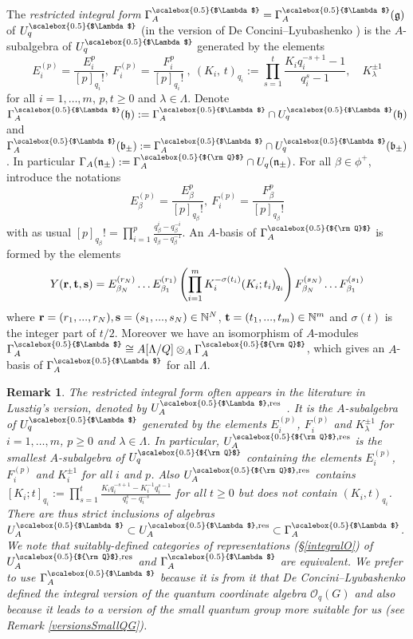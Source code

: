 \documentclass[11pt]{amsart}
\newtheorem{remark}[teo]{Remark}
\newcommand{\Q}{{\scalebox{0.5}{${\rm Q}$}}}
\newcommand{\Lam}{{\scalebox{0.5}{$\Lambda$}}}
\begin{document}
\indent The {\em restricted integral form} $\Gamma_A^\Lam = \Gamma_A^\Lam(\mathfrak{g})$ of $U_q^\Lam$ (in the version of De Concini--Lyubashenko \cite{DC-L}) is the $A$-subalgebra of $U_q^\Lam$ generated by the  elements
$$ E_i^{(p)} = \frac{E_i^p}{[p]_{q_i}!},\ F_i^{(p)} = \frac{F_i^p}{[p]_{q_i}!}\ , \ (K_i,\,t)_{q_i} := \prod_{s=1}^t \frac{K_iq_i^{-s+1}-1}{q_i^s-1}, \quad K_{\lambda}^{\pm 1} $$
for all $i=1,\ldots,m$, $p, t \geq 0$ and $\lambda \in \Lambda$. Denote $\Gamma_A^\Lam({\mathfrak h}):=\Gamma_A^\Lam \cap U_q^\Lam(\mathfrak h)$ and $\Gamma_A^\Lam({\mathfrak b}_{\pm}):=\Gamma_A^\Lam \cap U_q^\Lam(\mathfrak b_{\pm})$.  In particular $\Gamma_A({\mathfrak n}_{\pm}):=\Gamma_A^\Q \cap U_q(\mathfrak n_{\pm})$. For all $\beta \in \phi^+$, introduce the notations
\begin{equation}\label{defDivPowerBeta}
E_\beta^{(p)} = \frac{E_\beta^p}{[p]_{q_\beta}!},\ F_i^{(p)} = \frac{F_\beta^p}{[p]_{q_\beta}!}
\end{equation}
with as usual $\textstyle [p]_{q_\beta}! = \prod_{i=1}^p \frac{q_\beta^i - q_\beta^{-i}}{q_\beta - q_\beta^{-1}}$. An $A$-basis of $\Gamma_A^\Q$ is formed by the elements
\begin{equation}\label{basegamma}
Y({\bf r}, {\bf t}, {\bf s})=E_{\beta_N}^{(r_N)}\ldots E_{\beta_1}^{(r_1)}\left(\prod_{i=1}^m K_i^{-\sigma(t_i)}(K_i; t_i)_{q_i} \right)F_{\beta_N}^{(s_N)}\ldots F_{\beta_1}^{(s_1)}
\end{equation}
where ${\bf r}=(r_1,...,r_N), {\bf s}=(s_1,...,s_N)\in {\mathbb N}^N$, ${\bf t}=(t_1,...,t_m)\in {\mathbb N}^m$ and $\sigma(t)$ is the integer part of $t/2$. Moreover we have an  isomorphism of $A$-modules $\Gamma_A^{\Lam} \cong A[\Lambda/Q] \otimes_A \Gamma_A^\Q$, which gives an $A$-basis of $\Gamma_A^\Lam$ for all $\Lambda$.

\begin{remark}\label{comparaisonRestrictedVersions}
{\rm The restricted integral form often appears in the literature in Lusztig's version, denoted by $U_A^{\Lam,{\rm res}}$ \cite{Lusztig0,Lusztig1}. It is the $A$-subalgebra of $U_q^\Lam$ generated by the  elements $E_i^{(p)}$, $F_i^{(p)}$ and $K_{\lambda}^{\pm 1}$ for $i=1,\ldots,m$, $p\geq 0$ and $\lambda \in \Lambda$. In particular, $U_A^{\Q,{\rm res}}$ is the smallest $A$-subalgebra of $U_q^\Q$ containing the elements $E_i^{(p)}$, $F_i^{(p)}$ and $K_i^{\pm 1}$ for all $i$ and $p$. Also $U_A^{\Q,{\rm res}}$ contains $\textstyle [ K_i; t ]_{q_i}:= \prod_{s=1}^t \frac{K_iq_i^{-s+1}-K_i^{-1}q_i^{s-1}}{q_i^s-q_i^{-s}}$ for all $t \geq 0$ but does not contain $(K_i,t)_{q_i}$. There are thus strict inclusions of algebras $U_A^\Lam \subset U_A^{\Lam,{\rm res}} \subset \Gamma_A^\Lam$. We note that suitably-defined categories of representations (\S \ref{integralO}) of $U_A^{\Q,{\rm res}}$ and $\Gamma_A^\Lam$ are equivalent. We prefer to use $\Gamma_A^\Lam$ because it is from it that De Concini--Lyubashenko defined the integral version of the quantum coordinate algebra $\mathcal{O}_q(G)$ and also because it leads to a version of the small quantum group more suitable for us (see Remark \ref{versionsSmallQG}).}
\end{remark}
 
\end{document}
